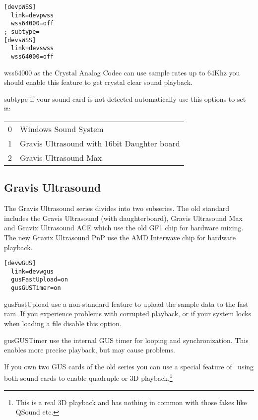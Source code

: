 \begin{verbatim}
[devpWSS]
  link=devpwss
  wss64000=off
; subtype=
[devsWSS]
  link=devswss
  wss64000=off 
\end{verbatim}
\begin{dojlist}
\item[wss64000] as the Crystal Analog Codec can use sample rates up to 64Khz
you should enable this feature to get crystal clear sound playback.
\item[subtype] if your sound card is not detected automatically use this 
options to set it: \\
  \begin{tabular}{l@{ -- }l}
  0 & Windows Sound System \\
  1 & Gravis Ultrasound with 16bit Daughter board \\
  2 & Gravis Ultrasound Max \\
  \end{tabular}
\end{dojlist}

\subsection{Gravis Ultrasound}
The Gravis Ultrasound series divides into two subseries. The old
standard includes the Gravis Ultrasound (with daughterboard), Gravis
Ultrasound Max and Gravix Ultrasound ACE which use the old GF1 chip
for hardware mixing. The new Gravix Ultrasound PnP use the AMD
Interwave chip for hardware playback.
\begin{verbatim}
[devwGUS]
  link=devwgus
  gusFastUpload=on
  gusGUSTimer=on
\end{verbatim}
\begin{dojlist}
\item[gusFastUpload] use a non-standard feature to upload the sample data to
the fast ram. If you experience problems with corrupted playback, or
if your system locks when loading a file disable this option.
\item[gusGUSTimer] use the internal GUS timer for looping and synchronization.
This enables more precise playback, but may cause problems.
\end{dojlist}

If you own two GUS cards of the old series you can use a special
feature of \cp\ using both sound cards to enable quadruple or 3D
playback.\footnote{This is a real 3D playback and has nothing in
common with those fakes like QSound etc.}

